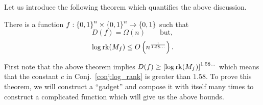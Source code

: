 \documentclass[letterpaper]{article}
\providecommand\rbrac[1]{\ensuremath \left(#1\right)}
\providecommand\sqbrac[1]{\ensuremath \left[#1\right]}
\providecommand\cbrac[1]{\ensuremath \left\{#1\right\}}
\providecommand{\bigo}{O}
\newcommand{\rk}{\mathrm{rk}}
\newcommand{\mf}{M_f}
\newcommand{\df}{D(f)}
\begin{document}
Let us introduce the following theorem which quantifies the above discussion.
\begin{theorem}
\label{thm:log_rank_bound}
There is a function $f: \cbrac{0,1}^n \times \cbrac{0,1}^n \to \cbrac{0,1}$ such that
$$
\df = \Omega(n) \qquad \mathrm{but},
$$
$$
\log \rk (\mf) \leq \bigo\rbrac{n^{\frac{1}{1.58\ldots}}}.
$$
\end{theorem}
\begin{remark}
First note that the above theorem implies $\df \geq \sqbrac{\log \rk (\mf)}^{1.58\ldots}$ which means that the constant $c$ in Conj.~\ref{conj:log_rank} is greater than $1.58$. To prove this theorem, we will construct a ``gadget'' and compose it with itself many times to construct a complicated function which will give us the above bounds.
\end{remark}
\end{document}
